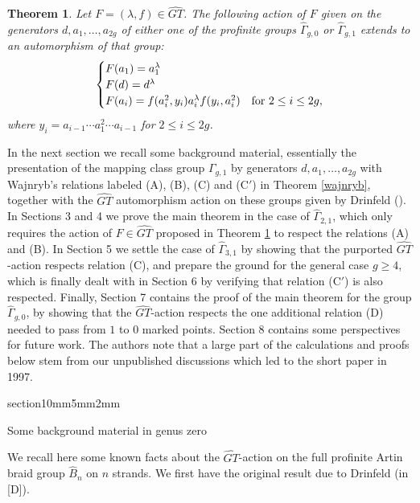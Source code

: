 \documentclass[a4paper,10pt,reqno]{amsart}
\makeatletter
\newcommand\GT{\widehat{GT}}
\newcommand\B{\widehat{B}}
\newcommand\GGone{\widehat{\Gamma}_{g,1}}
\newcommand\GGzero{\widehat{\Gamma}_{g,0}}
\newtheorem{thm}{Theorem}[section]
\renewcommand{\section}{\@startsection
{section}{1}{0mm}{5mm}{2mm}{\raggedright\bfseries}}
\makeatother
\begin{document}
\begin{thm}\label{thm11} Let $F=(\lambda,f)\in \GT$. 
The following action of $F$ given on the generators $d,a_1,\ldots,a_{2g}$
of either one of the profinite groups $\GGzero$ or $\GGone$
extends to an automorphism of that group:
\begin{equation}\label{Faction}
\begin{cases}
F(a_1)=a_1^\lambda\\
F(d)=d^\lambda\\
F(a_i)=f(a_i^2,y_i)a_i^\lambda f(y_i,a_i^2)&\hbox{for } 2\le i\le 2g,
\end{cases}
\end{equation}
where $y_i=a_{i-1}\cdots a_1^2\cdots a_{i-1}$ for $2\le i\le 2g$.
\end{thm}

\vspace{.3cm}
In the next section we recall some background material, essentially 
the presentation of the mapping class group
$\Gamma_{g,1}$ by generators $d,a_1,\ldots,a_{2g}$ with Wajnryb's
relations labeled (A), (B), (C) and (C$'$) in Theorem \ref{wajnryb}, together
with the $\GT$ automorphism action on these groups given by Drinfeld
(\cite{D}). In Sections 3 and 4 we prove the main theorem in the
case of $\widehat\Gamma_{2,1}$, which only requires the action of $F\in \GT$ 
proposed in Theorem \ref{thm11} to respect the relations 
(A) and (B). In Section 5 we settle the case of $\widehat\Gamma_{3,1}$ 
by showing that the purported $\GT$-action respects relation (C), and
prepare the ground for the general case $g\ge 4$, which is finally dealt 
with in Section 6 by verifying that relation (C$'$) is also respected. 
Finally, Section 7 contains the proof 
of the main theorem for the group $\GGzero$, by showing that the $\GT$-action 
respects the one additional relation (D) needed to pass from 
$1$ to $0$ marked points. Section 8 contains some perspectives for future
work.  The authors note that a large part of the calculations and proofs below 
stem from our unpublished discussions which led to the short paper \cite{LNS} 
in 1997.


\section{Some background material in genus zero}

We recall here some known facts about the $\widehat{GT}$-action on the full profinite
Artin braid group $\B_n$ on $n$ strands.  We first have the original result due
to Drinfeld (in [D]).
\end{document}
